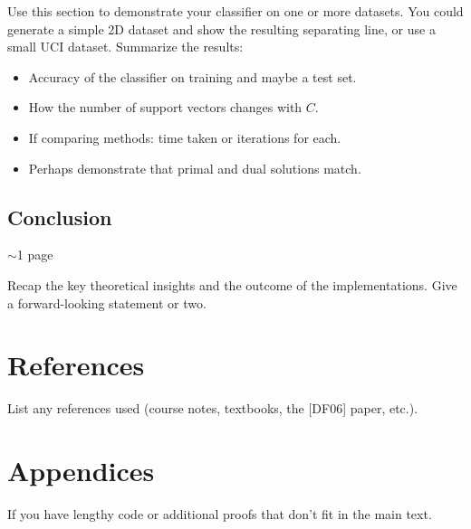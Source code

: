 Use this section to demonstrate your classifier on one or more datasets. You could generate a simple 2D dataset and show the resulting separating line, or use a small UCI dataset. Summarize the results:
\begin{itemize}
    \item Accuracy of the classifier on training and maybe a test set.
    \item How the number of support vectors changes with $C$.
    \item If comparing methods: time taken or iterations for each.
    \item Perhaps demonstrate that primal and dual solutions match.
\end{itemize}

\subsection{Conclusion}
$\sim$1 page

Recap the key theoretical insights and the outcome of the implementations. Give a forward-looking statement or two.

\section*{References}
List any references used (course notes, textbooks, the [DF06] paper, etc.).

\appendix
\section{Appendices}
If you have lengthy code or additional proofs that don't fit in the main text.